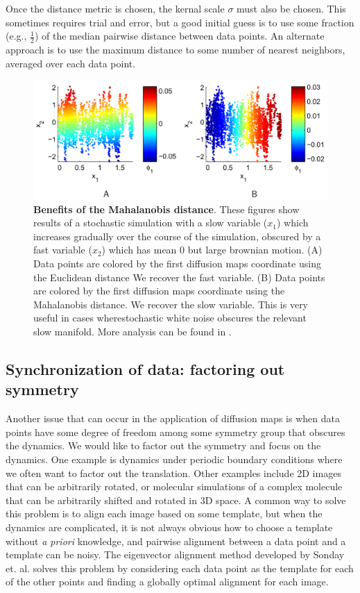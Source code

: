 \documentclass[12pt]{article}
\begin{document}
Once the distance metric is chosen, the kernal scale $\sigma$ must also be chosen. This sometimes requires trial and error, but a good initial guess is to use some fraction (e.g., $\frac{1}{2}$) of the median pairwise distance between data points. An alternate approach is to use the maximum distance to some number of nearest neighbors, averaged over each data point.

\begin{figure}[here]
\includegraphics[width=\linewidth]{figures/mahalanobis}
\caption{\textbf{Benefits of the Mahalanobis distance}. These figures show results of a stochastic simulation with a slow variable ($x_1$) which increases gradually over the course of the simulation, obscured by a fast variable ($x_2$) which has mean 0 but large brownian motion. (A) Data points are colored by the first diffusion maps coordinate using the Euclidean distance We recover the fast variable. (B) Data points are colored by the first diffusion maps coordinate using the Mahalanobis distance. We recover the slow variable. This is very useful in cases wherestochastic white noise obscures the relevant slow manifold. More analysis can be found in \cite{Dsilva2015}.}
\label{fig:mahalanobis}
\end{figure}

\subsection{Synchronization of data: factoring out symmetry}

Another issue that can occur in the application of diffusion maps is when data points have some degree of freedom among some symmetry group that obscures the dynamics. We would like to factor out the symmetry and focus on the dynamics. One example is dynamics under periodic boundary conditions where we often want to factor out the translation. Other examples include 2D images that can be arbitrarily rotated, or molecular simulations of a complex molecule that can be arbitrarily shifted and rotated in 3D space. A common way to solve this problem is to align each image based on some template, but when the dynamics are complicated, it is not always obvious how to choose a template without \textit{a priori} knowledge, and pairwise alignment between a data point and a template can be noisy. The eigenvector alignment method developed by Sonday et. al. \cite{Sonday2013} solves this problem by considering each data point as the template for each of the other points and finding a globally optimal alignment for each image. \vspace{1mm}
\end{document}
